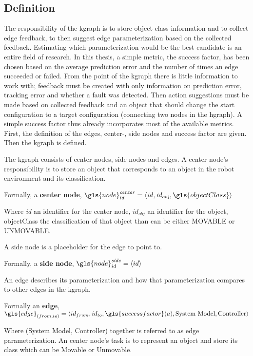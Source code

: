 \subsection{Definition}%
\label{subsec:kgraph_definition}
The responsibility of the \ac{kgraph} is to store object class information and to collect edge feedback, to then suggest edge parameterization based on the collected feedback. Estimating which parameterization would be the best candidate is an entire field of research. In this thesis, a simple metric, the success factor, has been chosen based on the average prediction error and the number of times an edge succeeded or failed. From the point of the \ac{kgraph} there is little information to work with; feedback must be created with only information on prediction error, tracking error and whether a fault was detected. Then action suggestions must be made based on collected feedback and an object that should change the start configuration to a target configuration (connecting two nodes in the \ac{hgraph}). A simple success factor thus already incorporates most of the available metrics. First, the definition of the edges, center-, side nodes and success factor are given. Then the \ac{kgraph} is defined.\bs

The \ac{kgraph} consists of center nodes, side nodes and edges. A center node's responsibility is to store an object that corresponds to an object in the robot environment and its classification.\bs

Formally, a \textbf{center node}, $\gls{node}^{\mathit{center}}_{id} =\left\langle \mathit{id}, \mathit{id_{obj}}, \gls{objectClass} \right\rangle $\bs

Where \textit{id} an identifier for the center node, $\mathit{id_{obj}}$ an identifier for the object, \gls{objectClass} the classification of that object than can be either MOVABLE or UNMOVABLE.\bs

\noindent A side node is a placeholder for the edge to point to.\bs

Formally, a \textbf{side node}, $\gls{node}^{\mathit{side}}_{id} =\left\langle id \right\rangle $\bs

\noindent An edge describes its parameterization and how that parameterization compares to other edges in the \ac{kgraph}.\bs

Formally an \textbf{edge}, $\gls{edge}_{(from, to)} = \left\langle id_{from}, id_{to}, \gls{successfactor}(a), \textrm{System Model}, \textrm{Controller}\right\rangle$\bs

Where (System Model, Controller) together is referred to as edge parameterization. An center node's task is to represent an object and store its class which can be Movable or Unmovable.\bs

